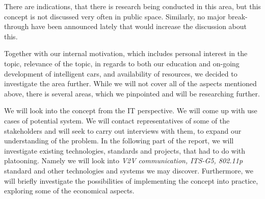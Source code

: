 There are indications, that there is research being conducted in this area, but this concept is not discussed very often in public space. Similarly, no major break-through have been announced lately that would increase the discussion about this.\par

Together with our internal motivation, which includes personal interest in the topic, relevance of the topic, in regards to both our education and on-going development of intelligent cars, and availability of resources, we decided to investigate the area further. While we will not cover all of the aspects mentioned above, there is several areas, which we pinpointed and will be researching further.\par

We will look into the concept from the IT perspective. We will come up with use cases of potential system. We will contact representatives of some of the stakeholders and will seek to carry out interviews with them, to expand our understanding of the problem. In the following part of the report, we will investigate existing technologies, standards and projects, that had to do with platooning. Namely we will look into \emph{V2V communication, ITS-G5, 802.11p} standard and other technologies and systems we may discover. Furthermore, we will briefly investigate the possibilities of implementing the concept into practice, exploring some of the economical aspects.


